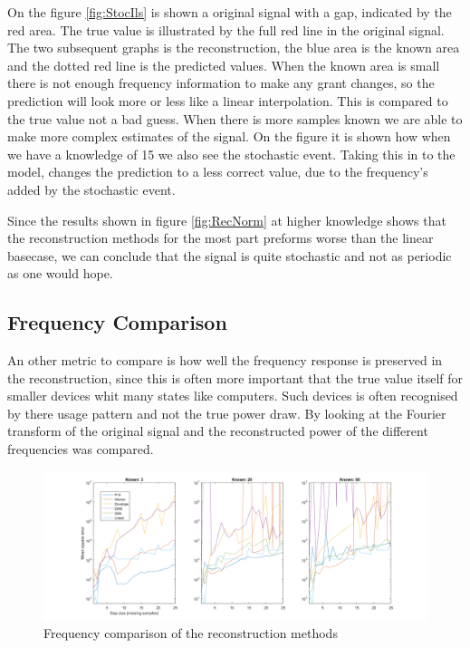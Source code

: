 On the figure \ref{fig:StocIls} is shown a original signal with a gap, indicated by the red area. The true value is illustrated by the full red line in the original signal. The two subsequent graphs is the reconstruction, the blue area is the known area and the dotted red line is the predicted values. When the known area is small there is not enough frequency information to make any grant changes, so the prediction will look more or less like a linear interpolation. This is compared to the true value not a bad guess. When there is more samples known we are able to make more complex estimates of the signal. On the figure it is shown how when we have a knowledge of 15 we also see the stochastic event. Taking this in to the model, changes the prediction to a less correct value, due to the frequency's added by the stochastic event. 

Since the results shown in figure \ref{fig:RecNorm} at higher knowledge shows that the reconstruction methods for the most part preforms worse than the linear basecase, we can conclude that the signal is quite stochastic and not as periodic as one would hope. 

\newpage

\subsection{Frequency Comparison}
An other metric to compare is how well the frequency response is preserved in the reconstruction, since this is often more important that the true value itself for smaller devices whit many states like computers. Such devices is often recognised by there usage pattern and not the true power draw. By looking at the Fourier transform of the original signal and the reconstructed power of the different frequencies was compared. 

\begin{figure}[H]
\centering
\includegraphics[width=1\textwidth]{billeder/RecFeq.png}
\caption{Frequency comparison of the reconstruction methods}
\label{fig:RecFeq}
\end{figure}

